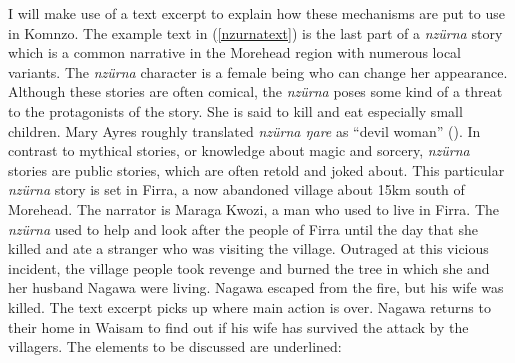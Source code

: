 I will make use of a text excerpt to explain how these mechanisms are put to use in Komnzo. The example text in (\ref{nzurnatext}) is the last part of a \emph{nzürna} story which is a common narrative in the Morehead region with numerous local variants. The \emph{nzürna} character is a female being who can change her appearance. Although these stories are often comical, the \emph{nzürna} poses some kind of a threat to the protagonists of the story. She is said to kill and eat especially small children. Mary Ayres roughly translated \emph{nzürna ŋare} as ``devil woman'' (\citeyear[93]{Ayres:ws}). In contrast to mythical stories, or knowledge about magic and sorcery, \emph{nzürna} stories are public stories, which are often retold and joked about. This particular \emph{nzürna} story is set in Firra, a now abandoned village about 15km south of Morehead. The narrator is Maraga Kwozi, a man who used to live in Firra. The \emph{nzürna} used to help and look after the people of Firra until the day that she killed and ate a stranger who was visiting the village. Outraged at this vicious incident, the village people took revenge and burned the tree in which she and her husband Nagawa were living. Nagawa escaped from the fire, but his wife was killed. The text excerpt picks up where main action is over. Nagawa returns to their home in Waisam to find out if his wife has survived the attack by the villagers. The elements to be discussed are underlined:

